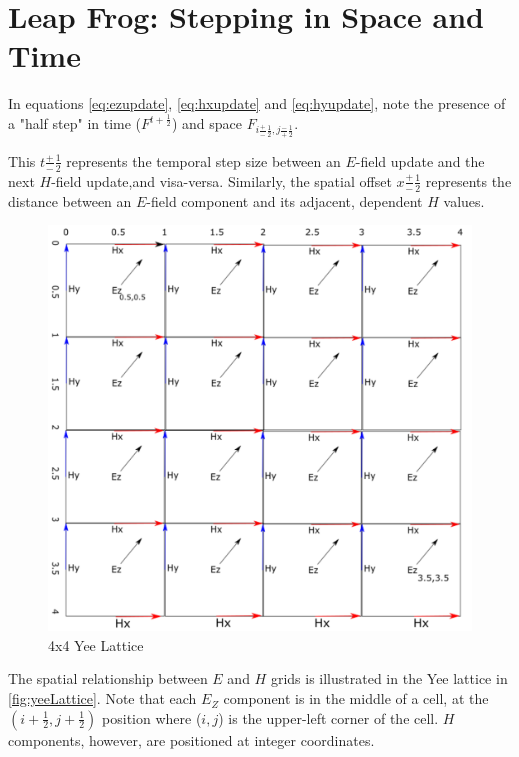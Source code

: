 \section{Leap Frog: Stepping in Space and Time}

In equations \ref{eq:ezupdate}, \ref{eq:hxupdate} and \ref{eq:hyupdate}, note the presence of a "half step" in time ($F^{t + \frac{1}{2}}$) and space $F_{i \frac{+}{-}\frac{1}{2},j \frac{-}{+}\frac{1}{2}}$.

This $t\frac{+}{-}\frac{1}{2}$ represents the temporal step size between an $E$-field update and the next $H$-field update,and visa-versa. Similarly, the spatial offset $x\frac{+}{-}\frac{1}{2}$ represents the distance between an $E$-field component and its adjacent, dependent $H$ values.


\begin{figure}[H]
	\centering
	\includegraphics[width=15cm,keepaspectratio]{YeeMesh.png}
	\caption{4x4 Yee Lattice}
	\label{fig:yeeLattice}
\end{figure}

The spatial relationship between $E$ and $H$ grids is illustrated in the Yee lattice in \autoref{fig:yeeLattice}. Note that each $E_Z$ component is in the middle of a cell, at the $(i + \frac{1}{2}, j + \frac{1}{2})$ position where ($i,j$) is  the upper-left corner of the cell. $H$ components, however, are positioned at integer coordinates.

